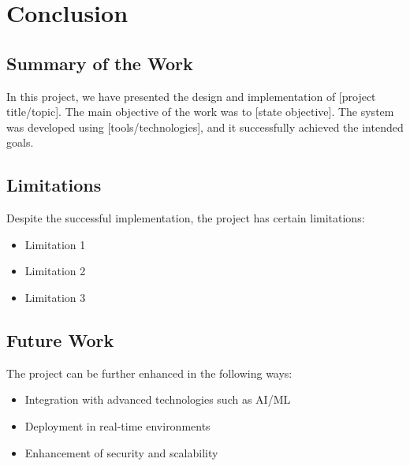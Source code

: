 \chapter{Conclusion}

\section{Summary of the Work}
In this project, we have presented the design and implementation of [project title/topic]. The main objective of the work was to [state objective]. The system was developed using [tools/technologies], and it successfully achieved the intended goals.

\section{Limitations}
Despite the successful implementation, the project has certain limitations:
\begin{itemize}
    \item Limitation 1
    \item Limitation 2
    \item Limitation 3
\end{itemize}

\section{Future Work}
The project can be further enhanced in the following ways:
\begin{itemize}
    \item Integration with advanced technologies such as AI/ML
    \item Deployment in real-time environments
    \item Enhancement of security and scalability
\end{itemize}

